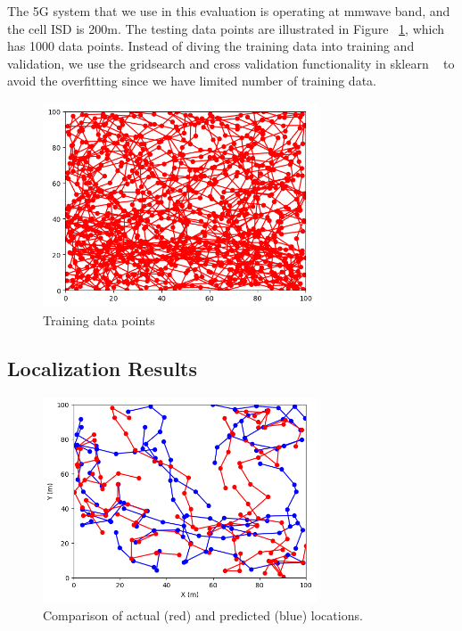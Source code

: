 \documentclass[conference, 10pt]{IEEEtran}
\begin{document}
\begin{NoHyper}
The 5G system that we use in this evaluation is operating at mmwave band, and the cell ISD is 200m. The testing data points are illustrated in 
Figure ~\ref{fig:training}, which has 1000 data points. Instead of diving the training data into training and validation, we use the gridsearch and cross validation functionality in 
sklearn ~\cite{sklearn} to avoid the overfitting since we have limited number of training data.

\begin{figure}[t]
	\begin{center}
	\includegraphics[height=2.4in,width=3.2in]{./GM_training.png}
	\caption{\label{fig:training}
	{\small Training data points}}
	\end{center}
	\end{figure}		

\subsection{Localization Results}


\begin{figure}[t]
\begin{center}
\includegraphics[height=2.4in,width=3.2in]{./Combined_path_illustration.png}
\caption{\label{fig:toyeg}
{\small Comparison of actual (red) and predicted (blue) locations.}}
\end{center}
\end{figure}



\end{NoHyper}
\end{document}
